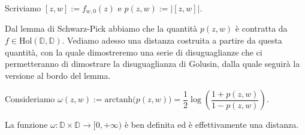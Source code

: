 \begin{defn}
  Scriviamo $[z,w]:=f_{w,0}(z)$ e $p(z,w):=|[z,w]|$.
\end{defn}

Dal lemma di Schwarz-Pick abbiamo che la quantità $p(z,w)$ è contratta da $f \in \text{Hol}(\mathbb{D}, \mathbb{D})$. Vediamo adesso una distanza costruita a partire da questa quantità, con la quale dimostreremo una serie di disuguaglianze che ci permetteranno di dimostrare la disuguaglianza di Golusin, dalla quale seguirà la versione al bordo del lemma.

 Consideriamo $\omega(z,w):=\text{arctanh}\bigl(p(z,w)\bigr)=\dfrac{1}{2}\log\left(\dfrac{1+p(z,w)}{1-p(z,w)}\right)$.

\begin{prop}
  La funzione $\omega: \mathbb{D}\times \mathbb{D} \longrightarrow [0,+\infty)$ è ben definita ed è effettivamente una distanza.
\end{prop}


